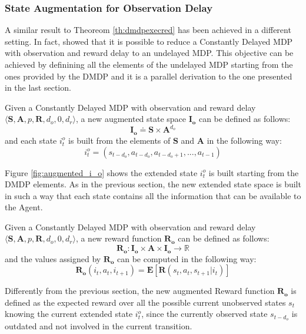             \subsubsection{State Augmentation for Observation Delay}
                A similar result to Theoreom \ref{th:dmdpexecred} has been achieved in a different setting. In fact,  showed that it is possible to reduce a Constantly Delayed MDP with observation and reward delay to an undelayed MDP. This objective can be achieved by definining all the elements of the undelayed MDP starting from the ones provided by the DMDP and it is a parallel derivation to the one presented in the last section. 
                
                \begin{definition}
                    \label{def:obsaugmentstate}
                    Given a Constantly Delayed MDP with observation and reward delay $\langle \mathbf{S}, \mathbf{A}, p, \mathbf{R}, d_o, 0, d_r \rangle$,
                    a new augmented state space $\mathbf{I_{o}}$ can be defined as follows:
                    \[ \mathbf{I_{o}} \doteq \mathbf{S} \times \mathbf{A}^{d_o} \]
                    and each state $i^o_t$ is built from the elements of $\mathbf{S}$ and $\mathbf{A}$ in the following way:
                    \[ i_t^o= \left( s_{t-d_{o}}, a_{t-d_{o}}, a_{t-d_{o}+1}, ..., a_{t-1} \right)\]
                \end{definition}
                \noindent
                Figure \ref{fig:augmented_i_o} shows the extended state $i_t^o$ is built starting from the DMDP elements. As in the previous section, the new extended state space is built in such a way that each state contains all the information that can be available to the Agent.
                
                \begin{definition}
                    \label{def:obsaugmentreward}
                    Given a Constantly Delayed MDP with observation and reward delay $ \langle \mathbf{S}, \mathbf{A}, p, \mathbf{R}, d_o, 0, d_r \rangle$,
                    a new reward function $\mathbf{R_{o}}$ can be defined as follows:
                    \[ \mathbf{R_{o}}: \mathbf{I_{o}} \times \mathbf{A} \times \mathbf{I_{o}} \rightarrow \mathds{R}\]
                    and the values assigned by $\mathbf{R_{o}}$ can be computed in the following way:
                    \[ \mathbf{R_{o}}\left( i_t, a_{t}, i_{t+1} \right) = \mathbf{E} \left[ \mathbf{R} \left( s_t, a_t, s_{t+1} | i_t \right) \right] \]
                \end{definition}
                \noindent
                Differently from the previous section, the new augmented Reward function $\mathbf{R_o}$ is defined as the expected reward over all the possible current unobserved states $s_t$ knowing the current extended state $i^o_t$, since the currently observed state $s_{t-d_{o}}$ is outdated and not involved in the current transition. 
                
